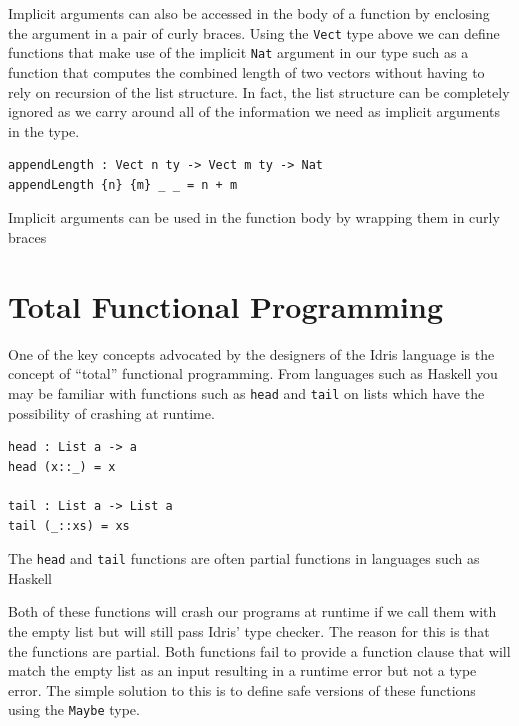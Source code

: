 \documentclass[a4paper, notitlepage]{report}
\begin{document}
Implicit arguments can also be accessed in the body of a function by enclosing
the argument in a pair of curly braces. Using the \texttt{Vect} type above we can define
functions that make use of the implicit \texttt{Nat} argument in our type such as a
function that computes the combined length of two vectors without having to rely
on recursion of the list structure. In fact, the list structure can be
completely ignored as we carry around all of the information we need as implicit
arguments in the type.

\begin{listing}[H]
\begin{verbatim}
appendLength : Vect n ty -> Vect m ty -> Nat
appendLength {n} {m} _ _ = n + m
\end{verbatim}
\caption{Implicit arguments can be used in the function body by wrapping them in curly braces}
\end{listing}

\section{Total Functional Programming}
\label{sec:orgf85baee}
One of the key concepts advocated by the designers of the Idris language is the
concept of ``total'' functional programming. From languages such as Haskell you
may be familiar with functions such as \texttt{head} and \texttt{tail} on lists which have the
possibility of crashing at runtime.

\begin{listing}[H]
\begin{verbatim}
head : List a -> a
head (x::_) = x

tail : List a -> List a
tail (_::xs) = xs
\end{verbatim}
\caption{The \texttt{head} and \texttt{tail} functions are often partial functions in languages such as Haskell}
\end{listing}

Both of these functions will crash our programs at runtime if we call them with
the empty list but will still pass Idris' type checker. The reason for this is
that the functions are partial. Both functions fail to provide a function clause
that will match the empty list as an input resulting in a runtime error but not
a type error. The simple solution to this is to define safe versions of these
functions using the \texttt{Maybe} type.
\end{document}
